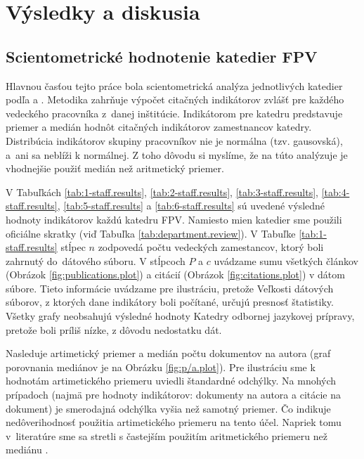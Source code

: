 \chapter{Výsledky a diskusia}

\section{Scientometrické hodnotenie katedier FPV}

Hlavnou časťou tejto práce bola scientometrická analýza jednotlivých katedier
podľa \citet{Kazakis2014a} a \citet{Kazakis2014b,Kazakis2015}. Metodika zahrňuje
výpočet citačných indikátorov zvlášť pre každého vedeckého pracovníka 
z~danej inštitúcie. Indikátorom pre katedru predstavuje priemer a medián 
hodnôt citačných indikátorov zamestnancov katedry. 
Distribúcia indikátorov skupiny pracovníkov nie je normálna (tzv. gausovská), 
a~ani sa neblíži k normálnej. Z toho dôvodu si myslíme, že na túto analýzuje je
vhodnejšie použiť medián než aritmetický priemer.  

V Tabuľkách  \ref{tab:1-staff.results}, \ref{tab:2-staff.results},
\ref{tab:3-staff.results}, \ref{tab:4-staff.results}, \ref{tab:5-staff.results}
a \ref{tab:6-staff.results} sú uvedené výsledné hodnoty indikátorov každú
katedru FPV.  Namiesto mien katedier sme použili oficiálne skratky (viď Tabuľka
\ref{tab:department.review}).  V Tabuľke  \ref{tab:1-staff.results} stĺpec $n$
zodpovedá počtu vedeckých zamestancov, ktorý boli zahrnutý do~dátového súboru.
V stĺpcoch $P$ a $c$ uvádzame sumu všetkých článkov (Obrázok
\ref{fig:publications.plot}) a citácií (Obrázok \ref{fig:citations.plot})
v dátom súbore.  Tieto informácie uvádzame pre ilustráciu, pretože Veľkosti
dátových súborov, z ktorých dane indikátory boli počítané, určujú presnosť
štatistiky. Všetky grafy neobsahujú výsledné hodnoty Katedry odbornej
jazykovej prípravy, pretože boli príliš nízke, z dôvodu nedostatku dát.

Nasleduje artimetický priemer a medián počtu dokumentov na autora (graf
porovnania mediánov je na Obrázku \ref{fig:p/a.plot}).  Pre ilustráciu sme k
hodnotám artimetického priemeru uviedli štandardné odchýlky.  Na mnohých
prípadoch (najmä pre hodnoty indikátorov: dokumenty na autora a citácie na dokument)
je smerodajná odchýlka vyšia než samotný priemer. Čo indikuje nedôverihodnosť
použitia artimetického priemeru na tento účel. Napriek tomu v~literatúre sme sa
stretli s častejším použitím aritmetického priemeru než mediánu
\citep{Lazaridis2010}.  

